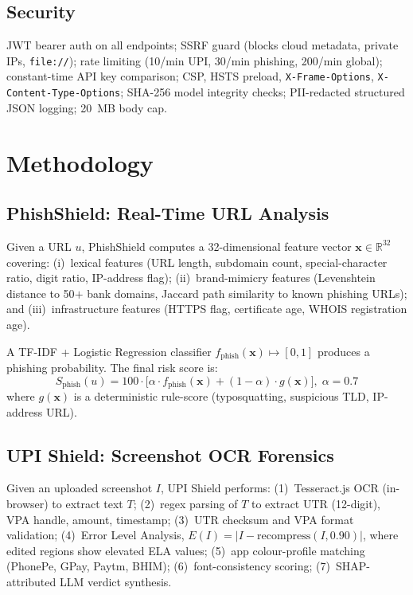\documentclass[conference]{IEEEtran}
\begin{document}
\subsection{Security}
JWT bearer auth on all endpoints; SSRF guard (blocks cloud metadata,
private IPs, \texttt{file://}); rate limiting (10/min UPI, 30/min
phishing, 200/min global); constant-time API key comparison; CSP, HSTS
preload, \texttt{X-Frame-Options}, \texttt{X-Content-Type-Options};
SHA-256 model integrity checks; PII-redacted structured JSON logging;
20~MB body cap.

\section{Methodology}

\subsection{PhishShield: Real-Time URL Analysis}
Given a URL $u$, PhishShield computes a 32-dimensional feature vector
$\mathbf{x}\!\in\!\mathbb{R}^{32}$ covering: (i)~lexical features
(URL length, subdomain count, special-character ratio, digit ratio,
IP-address flag); (ii)~brand-mimicry features (Levenshtein distance
to 50$+$ bank domains, Jaccard path similarity to known phishing
URLs); and (iii)~infrastructure features (HTTPS flag, certificate
age, WHOIS registration age).

A TF-IDF + Logistic Regression classifier
$f_{\text{phish}}(\mathbf{x})\!\mapsto\![0,1]$ produces a phishing
probability. The final risk score is:
\begin{equation}
S_{\text{phish}}(u) = 100\cdot\bigl[\alpha\cdot f_{\text{phish}}(\mathbf{x}) + (1{-}\alpha)\cdot g(\mathbf{x})\bigr],\; \alpha{=}0.7
\end{equation}
where $g(\mathbf{x})$ is a deterministic rule-score (typosquatting,
suspicious TLD, IP-address URL).

\subsection{UPI Shield: Screenshot OCR Forensics}
Given an uploaded screenshot $I$, UPI Shield performs: (1)~Tesseract.js
OCR (in-browser) to extract text $T$; (2)~regex parsing of $T$ to
extract UTR (12-digit), VPA handle, amount, timestamp;
(3)~UTR checksum and VPA format validation; (4)~Error Level Analysis,
$E(I) = |I - \mathrm{recompress}(I, 0.90)|$, where edited regions show
elevated ELA values; (5)~app colour-profile matching (PhonePe, GPay,
Paytm, BHIM); (6)~font-consistency scoring; (7)~SHAP-attributed LLM
verdict synthesis.
\end{document}
